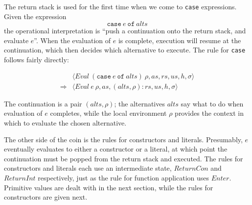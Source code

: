 The return stack is used for the first time when we come to \texttt{case} expressions. Given the expression
\begin{displaymath}
\texttt{case}~e~\texttt{of}~\mathit{alts}
\end{displaymath}
the operational interpretation is ``push a continuation onto the return stack, and evaluate $e$''. When the evaluation of $e$ is complete, execution will resume at the continuation, which then decides which alternative to execute. The rule for \texttt{case} follows fairly directly:
\begin{mdframed}
\begin{equation}
\begin{array}{cl}
 & \langle \mathit{Eval}~(\texttt{case}~e~\texttt{of}~\mathit{alts})~\rho, \mathit{as}, \mathit{rs}, \mathit{us}, h, \sigma \rangle \\[0.25cm]
\Longrightarrow & \langle \mathit{Eval}~e~\rho, \mathit{as}, (\mathit{alts}, \rho) : \mathit{rs}, \mathit{us}, h, \sigma \rangle 
\end{array}
\end{equation}
\end{mdframed}
The continuation is a pair $(\mathit{alts}, \rho)$; the alternatives $\mathit{alts}$ say what to do when evaluation of $e$ completes, while the local environment $\rho$ provides the context in which to evaluate the chosen alternative. 

The other side of the coin is the rules for constructors and literals. Presumably, $e$ eventually evaluates to either a constructor or a literal, at which point the continuation must be popped from the return stack and executed. The rules for constructors and literals each use an intermediate state, $\mathit{ReturnCon}$ and $\mathit{ReturnInt}$ respectively, just as the rule for function application uses $\mathit{Enter}$. Primitive values are dealt with in the next section, while the rules for constructors are given next.

